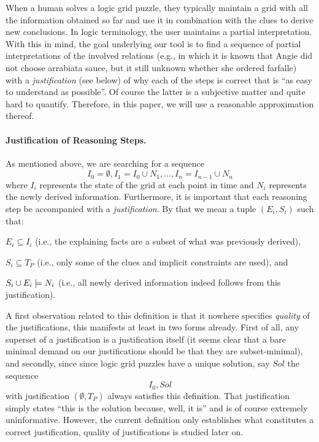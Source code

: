
When a human solves a logic grid puzzle, they typically maintain a grid with all the information obtained so far and use it in combination with the clues to derive new conclusions. In logic terminology, the user maintains a partial interpretation.  
With this in mind, the goal underlying our tool is to find a sequence of partial interpretations of the involved relations (e.g., in which it is known that Angie did not choose arrabiata sauce, but it still unknown whether she ordered farfalle) with a 
\emph{justification} (see below) of why each of the steps is correct that is ``as easy to understand as possible''. 
Of course the latter is a subjective matter and quite hard to quantify. Therefore, in this paper, we will use a reasonable approximation thereof. 


\paragraph{Justification of Reasoning Steps.}
As mentioned above, we are searching for a sequence 
\[ I_0 = \emptyset, I_1 = I_0 \cup N_1, \dots , I_n = I_{n-1}\cup N_n\]
where $I_i$ represents the state of the grid at each point in time and $N_i$ represents the newly derived information. 
Furthermore, it is important that each reasoning step be accompanied with a \emph{justification}. By that we mean a tuple $(E_i,S_i)$ such that: 
\begin{compactitem}
	\item $E_i\subseteq I_i$ (i.e., the explaining facts are a subset of what was previously derived),
	\item $S_i \subseteq T_P$ (i.e., only some of the clues and implicit constraints are used), and 
	\item $S_i \cup E_i \models N_i$ (i.e., all newly derived information indeed follows from this justification).
\end{compactitem}
A first observation related to this definition is that it nowhere specifies \emph{quality} of the justifications, this manifests at least in two forms already. First of all, any superset of a justification is a justification itself (it seems clear that a bare minimal demand on our justifications should be that they are subset-minimal), and secondly, since since logic grid puzzles have a unique solution, say $Sol$ the sequence 
\[I_0, Sol\]
with justification $(\emptyset,T_P)$ always satisfies this definition. That justification simply states ``this is the solution because, well, it is'' and is of course extremely uninformative. However, the current definition only establishes what constitutes a correct justification, quality of justifications is studied later on. 

